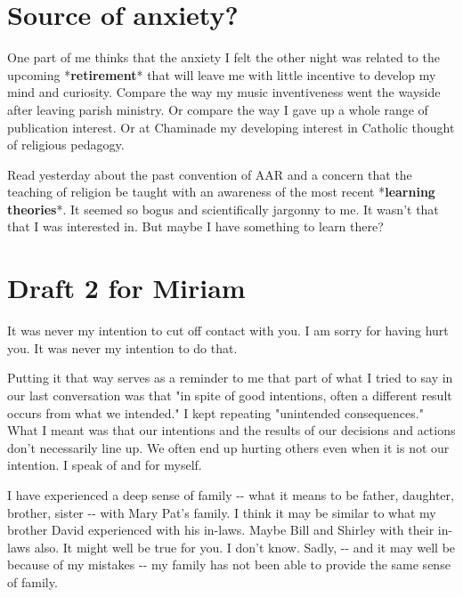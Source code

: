 \documentclass[]{article}
\date{}
\begin{document}
\hypertarget{Sourceux20ofux20anxietyux3f}{%
\section{Source of anxiety?}\label{Sourceux20ofux20anxietyux3f}}

One part of me thinks that the anxiety I felt the other night was
related to the upcoming
*\protect\hypertarget{retirement}{}{}\textbf{retirement}* that will
leave me with little incentive to develop my mind and curiosity. Compare
the way my music inventiveness went the wayside after leaving parish
ministry. Or compare the way I gave up a whole range of publication
interest. Or at Chaminade my developing interest in Catholic thought of
religious pedagogy.

Read yesterday about the past convention of AAR and a concern that the
teaching of religion be taught with an awareness of the most recent
*\protect\hypertarget{learningux20theories}{}{}\textbf{learning
theories}*. It seemed so bogus and scientifically jargonny to me. It
wasn't that that I was interested in. But maybe I have something to
learn there?

\hypertarget{Draftux202ux20forux20Miriam}{%
\section{Draft 2 for Miriam}\label{Draftux202ux20forux20Miriam}}

It was never my intention to cut off contact with you. I am sorry for
having hurt you. It was never my intention to do that.

Putting it that way serves as a reminder to me that part of what I tried
to say in our last conversation was that "in spite of good intentions,
often a different result occurs from what we intended." I kept repeating
"unintended consequences." What I meant was that our intentions and the
results of our decisions and actions don't necessarily line up. We often
end up hurting others even when it is not our intention. I speak of and
for myself.

I have experienced a deep sense of family -\/- what it means to be
father, daughter, brother, sister -\/- with Mary Pat's family. I think
it may be similar to what my brother David experienced with his in-laws.
Maybe Bill and Shirley with their in-laws also. It might well be true
for you. I don't know. Sadly, -\/- and it may well be because of my
mistakes -\/- my family has not been able to provide the same sense of
family.
\end{document}
